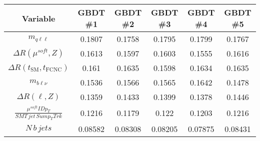 \documentclass[a4paper]{article}
\begin{document}
\begin{tabular}{cccccc}
\toprule
Variable & GBDT \#1 & GBDT \#2 & GBDT \#3 & GBDT \#4 & GBDT \#5 \\
\midrule
$m_{q\ell\ell}$  &  0.1807  &  0.1758  &  0.1795  &  0.1799  &  0.1767  \\ 
$\Delta R(\mu^{soft},Z)$  &  0.1613  &  0.1597  &  0.1603  &  0.1555  &  0.1616  \\ 
$\Delta R(t_{\text{SM}},t_{\text{FCNC}})$  &  0.161  &  0.1635  &  0.1598  &  0.1634  &  0.1635  \\ 
$m_{b\ell\nu}$  &  0.1536  &  0.1566  &  0.1565  &  0.1642  &  0.1478  \\ 
$\Delta R(\ell,Z)$  &  0.1359  &  0.1433  &  0.1399  &  0.1378  &  0.1446  \\ 
$\frac{\mu^{soft} ID p_{T}}{SMT\,jet\,Sum p_{T} Trk}$  &  0.1216  &  0.1179  &  0.122  &  0.1203  &  0.1216  \\ 
$N\,b\,jets$  &  0.08582  &  0.08308  &  0.08205  &  0.07875  &  0.08431  \\ 
\bottomrule
\end{tabular}
\end{document}
